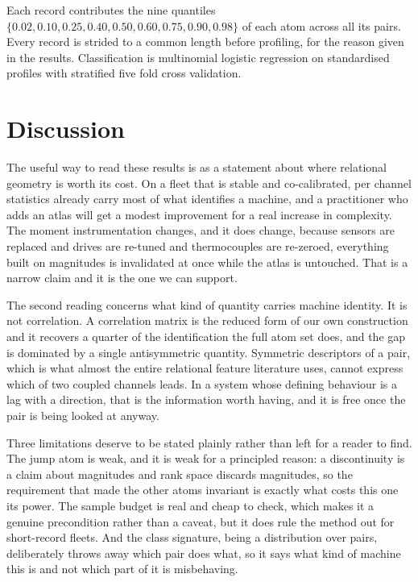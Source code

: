 \documentclass[11pt]{article}
\begin{document}
Each record contributes the nine quantiles $\{0.02,0.10,0.25,0.40,0.50,0.60,
0.75,0.90,0.98\}$ of each atom across all its pairs. Every record is strided to
a common length before profiling, for the reason given in the results.
Classification is multinomial logistic regression on standardised profiles with
stratified five fold cross validation.

\section{Discussion}

The useful way to read these results is as a statement about where relational
geometry is worth its cost. On a fleet that is stable and co-calibrated, per
channel statistics already carry most of what identifies a machine, and a
practitioner who adds an atlas will get a modest improvement for a real
increase in complexity. The moment instrumentation changes, and it does change,
because sensors are replaced and drives are re-tuned and thermocouples are
re-zeroed, everything built on magnitudes is invalidated at once while the
atlas is untouched. That is a narrow claim and it is the one we can support.

The second reading concerns what kind of quantity carries machine identity. It
is not correlation. A correlation matrix is the reduced form of our own
construction and it recovers a quarter of the identification the full atom set
does, and the gap is dominated by a single antisymmetric quantity. Symmetric
descriptors of a pair, which is what almost the entire relational feature
literature uses, cannot express which of two coupled channels leads. In a
system whose defining behaviour is a lag with a direction, that is the
information worth having, and it is free once the pair is being looked at
anyway.

Three limitations deserve to be stated plainly rather than left for a reader to
find. The jump atom is weak, and it is weak for a principled reason: a
discontinuity is a claim about magnitudes and rank space discards magnitudes,
so the requirement that made the other atoms invariant is exactly what costs
this one its power. The sample budget is real and cheap to check, which makes
it a genuine precondition rather than a caveat, but it does rule the method out
for short-record fleets. And the class signature, being a distribution over
pairs, deliberately throws away which pair does what, so it says what kind of
machine this is and not which part of it is misbehaving.
\end{document}
